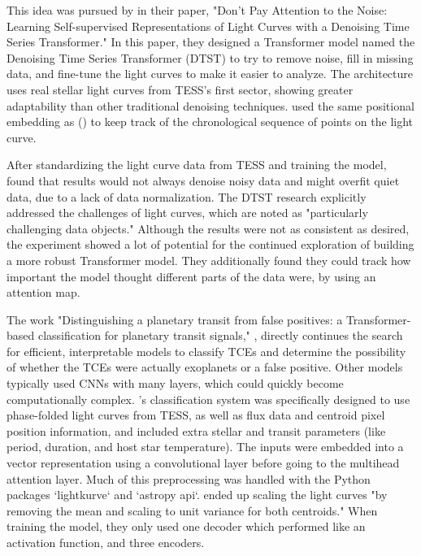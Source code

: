 \documentclass[letterpaper]{article} %
\begin{document}
This idea was pursued by \citeauthor{morvan2022dontpayattentionnoise} in their \citeyear{morvan2022dontpayattentionnoise} paper, "Don't Pay Attention to the Noise: Learning Self-supervised Representations of Light Curves with a Denoising Time Series Transformer." In this paper, they designed a Transformer model named the Denoising Time Series Transformer (DTST) to try to remove noise, fill in missing data, and fine-tune the light curves to make it easier to analyze. The architecture uses real stellar light curves from TESS's first sector, showing greater adaptability than other traditional denoising techniques. \citeauthor{morvan2022dontpayattentionnoise} used the same positional embedding as \citeauthor{vaswani2017attentionneed} (\citeyear{vaswani2017attentionneed}) to keep track of the chronological sequence of points on the light curve.

After standardizing the light curve data from TESS and training the model, \citeauthor{morvan2022dontpayattentionnoise} found that results would not always denoise noisy data and might overfit quiet data, due to a lack of data normalization. The DTST research explicitly addressed the challenges of light curves, which are noted as "particularly challenging data objects." Although the results were not as consistent as desired, the experiment showed a lot of potential for the continued exploration of building a more robust Transformer model. They additionally found they could track how important the model thought different parts of the data were, by using an attention map.

The work "Distinguishing a planetary transit from false positives: a Transformer-based classification for planetary transit signals," \cite{salinas2023distinguishingtransitfalsepositives}, directly continues the search for efficient, interpretable models to classify TCEs and determine the possibility of whether the TCEs were actually exoplanets or a false positive. Other models typically used CNNs with many layers, which could quickly become computationally complex. \citeauthor{salinas2023distinguishingtransitfalsepositives}'s classification system was specifically designed to use phase-folded light curves from TESS, as well as flux data and centroid pixel position information, and included extra stellar and transit parameters (like period, duration, and host star temperature). The inputs were embedded into a vector representation using a convolutional layer before going to the multihead attention layer. Much of this preprocessing was handled with the Python packages `lightkurve` and `astropy api`. \citeauthor{salinas2023distinguishingtransitfalsepositives} ended up scaling the light curves "by removing the mean and scaling to unit variance for both centroids." When training the model, they only used one decoder which performed like an activation function, and three encoders.
\end{document}
